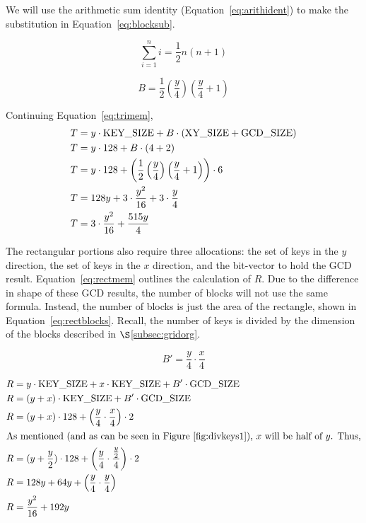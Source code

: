 \documentclass[smallextended]{svjour3}       %
\begin{document}
\noindent We will use the arithmetic sum identity\cite{cohen2011precalculus}
(Equation~\ref{eq:arithident}) to make the
substitution in Equation~\ref{eq:blocksub}.  

\begin{equation}
   \sum_{i=1}^{n}i = \frac{1}{2}n\left(n+1\right)
   \label{eq:arithident}
\end{equation}

\begin{equation}
   B = \frac{1}{2}\left(\frac{y}{4}\right) \left(\frac{y}{4}+1\right)
   \label{eq:blocksub}
\end{equation}

\noindent Continuing Equation~\ref{eq:trimem},
\begin{align}
   T & = y \cdot \textrm{KEY\_SIZE} + B \cdot (\textrm{XY\_SIZE} + \textrm{GCD\_SIZE})\notag\\
   T & = y \cdot 128 + B \cdot (4 + 2)\notag\\
   T & = y \cdot 128 + \left(\frac{1}{2}\left(\frac{y}{4}\right)\left(\frac{y}{4}+1\right)\right) \cdot 6\notag\\
   T & = 128 y + 3 \cdot \frac{y^2}{16} + 3 \cdot \frac{y}{4}\notag\\
   T & = 3 \cdot \frac{y^2}{16} + \frac{515y}{4}
   \label{eq:trimemcomplete}
\end{align}

The rectangular portions also require three allocations: the set of keys in the
$y$ direction, the set of keys in the $x$ direction, and the bit-vector to hold
the GCD result. Equation~\ref{eq:rectmem} outlines the calculation of $R$. Due
to the difference in shape of these GCD results, the number of blocks will not
use the same formula. Instead, the number of blocks is just the area of the
rectangle, shown in Equation~\ref{eq:rectblocks}. Recall, the number of keys is
divided by the dimension of the blocks described in $\S$\ref{subsec:gridorg}.

\begin{equation}
   B' = \frac{y}{4} \cdot \frac{x}{4}
   \label{eq:rectblocks}
\end{equation}

\begin{align}
   R & = y \cdot \textrm{KEY\_SIZE} + x \cdot \textrm{KEY\_SIZE} + B' \cdot \textrm{GCD\_SIZE}\\
   R & = (y + x) \cdot \textrm{KEY\_SIZE} + B' \cdot \textrm{GCD\_SIZE}\notag\\
   R & = (y + x) \cdot 128 + \left(\frac{y}{4} \cdot \frac{x}{4}\right) \cdot 2\notag\\
   \intertext{As mentioned (and as can be seen in Figure~\ref{fig:divkeys1}), $x$ will be half of $y$. Thus,}
   R & = (y + \frac{y}{2}) \cdot 128 + \left(\frac{y}{4} \cdot \frac{\frac{y}{2}}{4}\right) \cdot 2\notag\\
   R & = 128y + 64y + \left(\frac{y}{4} \cdot \frac{y}{4}\right)\notag\\
   R & = \frac{y^2}{16} + 192y
   \label{eq:rectmem}
\end{align}
\end{document}
